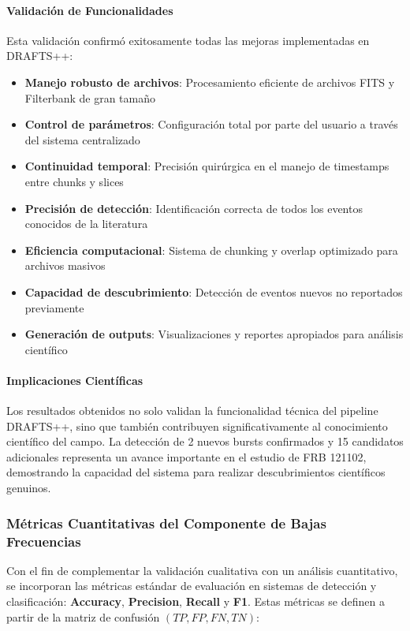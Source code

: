 \paragraph{Validación de Funcionalidades}

Esta validación confirmó exitosamente todas las mejoras implementadas en DRAFTS++:

\begin{itemize}
    \item \textbf{Manejo robusto de archivos}: Procesamiento eficiente de archivos FITS y Filterbank de gran tamaño
    \item \textbf{Control de parámetros}: Configuración total por parte del usuario a través del sistema centralizado
    \item \textbf{Continuidad temporal}: Precisión quirúrgica en el manejo de timestamps entre chunks y slices
    \item \textbf{Precisión de detección}: Identificación correcta de todos los eventos conocidos de la literatura
    \item \textbf{Eficiencia computacional}: Sistema de chunking y overlap optimizado para archivos masivos
    \item \textbf{Capacidad de descubrimiento}: Detección de eventos nuevos no reportados previamente
    \item \textbf{Generación de outputs}: Visualizaciones y reportes apropiados para análisis científico
\end{itemize}

\paragraph{Implicaciones Científicas}

Los resultados obtenidos no solo validan la funcionalidad técnica del pipeline DRAFTS++, sino que también contribuyen significativamente al conocimiento científico del campo. La detección de 2 nuevos bursts confirmados y 15 candidatos adicionales representa un avance importante en el estudio de FRB 121102, demostrando la capacidad del sistema para realizar descubrimientos científicos genuinos.

\subsubsection{Métricas Cuantitativas del Componente de Bajas Frecuencias}

Con el fin de complementar la validación cualitativa con un análisis cuantitativo, se incorporan las métricas estándar de evaluación en sistemas de detección y clasificación: \textbf{Accuracy}, \textbf{Precision}, \textbf{Recall} y \textbf{F1}. Estas métricas se definen a partir de la matriz de confusión \((TP, FP, FN, TN)\):

